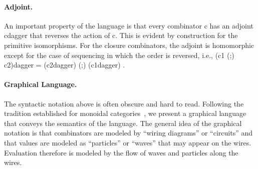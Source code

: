 \documentclass{llncs}
\begin{document}
\paragraph*{Adjoint.} 
An important property of the language is that every combinator {{c}} has an
adjoint {{c{dagger}}} that reverses the action of {{c}}. This is evident by
construction for the primitive isomorphisms. For the closure combinators, the
adjoint is homomorphic except for the case of sequencing in which the order
is reversed, i.e., {{(c1 (;) c2){dagger} = (c2{dagger}) (;) (c1{dagger}) }}.

\paragraph*{Graphical Language.}
The syntactic notation above is often obscure and hard to read.  Following
the tradition established for monoidal
categories~\cite{springerlink:10.1007/978-3-642-12821-94}, we present a
graphical language that conveys the semantics of the language.  The general
idea of the graphical notation is that combinators are modeled by ``wiring
diagrams'' or ``circuits'' and that values are modeled as ``particles'' or
``waves'' that may appear on the wires. Evaluation therefore is modeled by
the flow of waves and particles along the wires.
\end{document}
